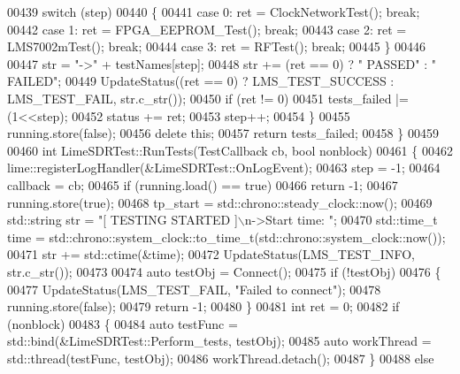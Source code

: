 \begin{DoxyCode}
{{{{{00439         \textcolor{keywordflow}{switch} (step)
00440         \{
00441             \textcolor{keywordflow}{case} 0: ret = ClockNetworkTest(); \textcolor{keywordflow}{break};
00442             \textcolor{keywordflow}{case} 1: ret = FPGA\_EEPROM\_Test(); \textcolor{keywordflow}{break};
00443             \textcolor{keywordflow}{case} 2: ret = LMS7002mTest(); \textcolor{keywordflow}{break};
00444             \textcolor{keywordflow}{case} 3: ret = RFTest(); \textcolor{keywordflow}{break};
00445         \}
00446 
00447         str = \textcolor{stringliteral}{"->"} + testNames[step];
00448         str += (ret == 0) ? \textcolor{stringliteral}{" PASSED"} : \textcolor{stringliteral}{" FAILED"};
00449         UpdateStatus((ret == 0) ? LMS_TEST_SUCCESS : LMS_TEST_FAIL, str.c\_str());
00450         \textcolor{keywordflow}{if} (ret != 0)
00451             tests\_failed |= (1<<step);
00452         status += ret;
00453         step++;
00454     \}
00455     running.store(\textcolor{keyword}{false});
00456     \textcolor{keyword}{delete} \textcolor{keyword}{this};
00457     \textcolor{keywordflow}{return} tests\_failed;
00458 \}
00459 
00460 \textcolor{keywordtype}{int} LimeSDRTest::RunTests(TestCallback cb, \textcolor{keywordtype}{bool} nonblock)
00461 \{
00462     lime::registerLogHandler(&LimeSDRTest::OnLogEvent);
00463     step = -1;
00464     callback = cb;
00465     \textcolor{keywordflow}{if} (running.load() == \textcolor{keyword}{true})
00466         \textcolor{keywordflow}{return} -1;
00467     running.store(\textcolor{keyword}{true});
00468     tp\_start = std::chrono::steady\_clock::now();
00469     std::string str = \textcolor{stringliteral}{"[ TESTING STARTED ]\(\backslash\)n->Start time: "};
00470     std::time\_t time = std::chrono::system\_clock::to\_time\_t(std::chrono::system\_clock::now());
00471     str += std::ctime(&time);
00472     UpdateStatus(LMS_TEST_INFO, str.c\_str());
00473 
00474     \textcolor{keyword}{auto} testObj = Connect();
00475     \textcolor{keywordflow}{if} (!testObj)
00476     \{
00477         UpdateStatus(LMS_TEST_FAIL, \textcolor{stringliteral}{"Failed to connect"});
00478         running.store(\textcolor{keyword}{false});
00479         \textcolor{keywordflow}{return} -1;
00480     \}
00481     \textcolor{keywordtype}{int} ret = 0;
00482     \textcolor{keywordflow}{if} (nonblock)
00483     \{
00484         \textcolor{keyword}{auto} testFunc = std::bind(&LimeSDRTest::Perform_tests, testObj);
00485         \textcolor{keyword}{auto} workThread = std::thread(testFunc, testObj);
00486         workThread.detach();
00487     \}
00488     \textcolor{keywordflow}{else}
}}}}}
\end{DoxyCode}
